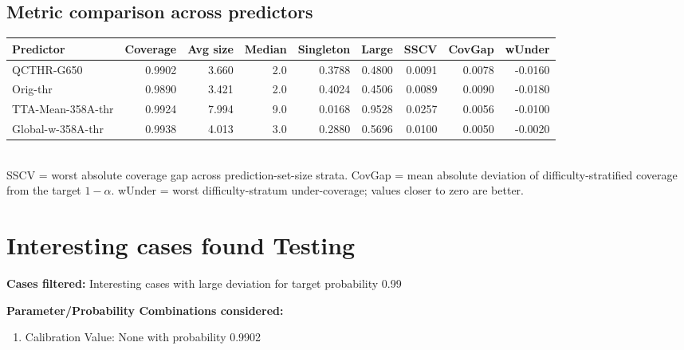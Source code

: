 \documentclass[parskip=half]{scrartcl}
\begin{document}
\subsection{Metric comparison across predictors}
\begin{tabular}{l r r r r r r r r}
\hline
Predictor & Coverage & Avg size & Median & Singleton & Large & SSCV & CovGap & wUnder \\
\hline
QCTHR-G650 & 0.9902 & 3.660 & 2.0 & 0.3788 & 0.4800 & 0.0091 & 0.0078 & -0.0160 \\
Orig-thr & 0.9890 & 3.421 & 2.0 & 0.4024 & 0.4506 & 0.0089 & 0.0090 & -0.0180 \\
TTA-Mean-358A-thr & 0.9924 & 7.994 & 9.0 & 0.0168 & 0.9528 & 0.0257 & 0.0056 & -0.0100 \\
Global-w-358A-thr & 0.9938 & 4.013 & 3.0 & 0.2880 & 0.5696 & 0.0100 & 0.0050 & -0.0020 \\
\hline
\end{tabular}\\[0.5em]
\textsf{\scriptsize SSCV = worst absolute coverage gap across prediction-set-size strata. CovGap = mean absolute deviation of difficulty-stratified coverage from the target $1-\alpha$. wUnder = worst difficulty-stratum under-coverage; values closer to zero are better.}\\
\section{Interesting cases found Testing}
\textbf{Cases filtered:} Interesting cases with large deviation for target probability 0.99


\textbf{Parameter/Probability Combinations considered:}\begin{enumerate}
\item Calibration Value: None with probability 0.9902
\end{enumerate}
        
\end{document}

